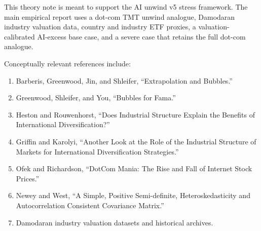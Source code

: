 \documentclass[10pt]{article}
\begin{document}
This theory note is meant to support the AI unwind v5 stress framework. The main empirical report uses a dot-com TMT unwind analogue, Damodaran industry valuation data, country and industry ETF proxies, a valuation-calibrated AI-excess base case, and a severe case that retains the full dot-com analogue.

Conceptually relevant references include:

\begin{enumerate}
\item Barberis, Greenwood, Jin, and Shleifer, ``Extrapolation and Bubbles.''
\item Greenwood, Shleifer, and You, ``Bubbles for Fama.''
\item Heston and Rouwenhorst, ``Does Industrial Structure Explain the Benefits of International Diversification?''
\item Griffin and Karolyi, ``Another Look at the Role of the Industrial Structure of Markets for International Diversification Strategies.''
\item Ofek and Richardson, ``DotCom Mania: The Rise and Fall of Internet Stock Prices.''
\item Newey and West, ``A Simple, Positive Semi-definite, Heteroskedasticity and Autocorrelation Consistent Covariance Matrix.''
\item Damodaran industry valuation datasets and historical archives.
\end{enumerate}
\end{document}
